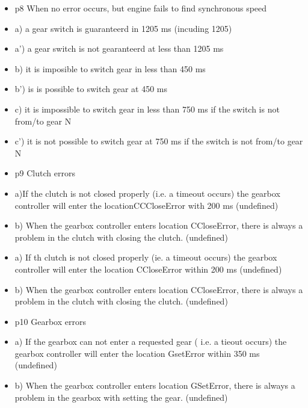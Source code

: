 \documentclass{article}
\begin{document}
\begin{itemize}
		
		\item  p8 When no error occurs, but engine fails to find synchronous speed
		\item  a) a gear switch is guaranteerd in 1205 ms (incuding 1205)
		\item  a') a gear switch is not gearanteerd at less than 1205 ms
		\item  b) it is imposible to switch gear in less than 450 ms
		\item  b') is is possible to switch gear at 450 ms
		\item  c) it is impossible to switch gear in less than 750 ms if the switch is not from/to gear N
		\item  c') it is not possible to switch gear at 750 ms if the switch is not from/to gear N
		
		
		\item  p9 Clutch errors
		\item  a)If the clutch is not closed properly (i.e. a timeout occurs) the gearbox  controller will enter the locationCCCloseError with 200 ms   (undefined)
		\item  b)  When the gearbox controller enters location CCloseError, there is always a problem in the clutch with closing the clutch.  (undefined)
		\item  a) If th clutch is not closed properly (ie. a timeout occurs) the gearbox controller will enter the location CCloseError within 200 ms (undefined)
		\item  b) When the gearbox controller enters location CCloseError, there is always a problem in the clutch with closing the clutch. (undefined)
		
		
		\item  p10 Gearbox errors  
		\item  a) If the gearbox can not enter a requested gear ( i.e. a tieout occurs) the gearbox controller will enter the location GsetError within 350 ms (undefined)
		\item  b) When the gearbox controller enters location GSetError, there is always a problem in the gearbox with setting the gear. (undefined)
		

\end{itemize}
\end{document}
